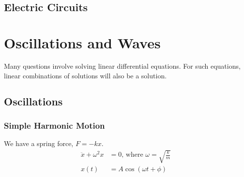 \documentclass[11pt, letterpaper]{article}
\begin{document}
\begin{multicols*}{3}
\subsection{Electric Circuits}
\section{Oscillations and Waves}
Many questions involve solving linear differential equations. For such
equations, linear combinations of solutions will also be a solution.
\subsection{Oscillations}
\subsubsection{Simple Harmonic Motion}
We have a spring force, $F=-kx$.
\begin{align*}
  \ddot{x}+\omega^2x&=0 \text{, where }\omega=\sqrt{\frac{k}{m}}\\
  x(t)&=A \cos(\omega t+\phi)
\end{align*}

\end{multicols*}
\end{document}
